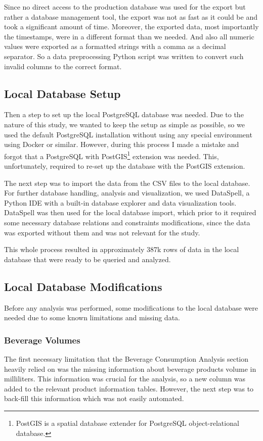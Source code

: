 Since no direct access to the production database was used for the export but rather a database management tool, the export was not as fast as it could be and took a significant amount of time.
Moreover, the exported data, most importantly the timestamps, were in a different format than we needed.
And also all numeric values were exported as a formatted strings with a comma as a decimal separator.
So a data preprocessing Python script was written to convert such invalid columns to the correct format.

\subsection{Local Database Setup}
\label{subsec:data-methodology-local-database-setup}
Then a step to set up the local PostgreSQL database was needed.
Due to the nature of this study, we wanted to keep the setup as simple as possible, so we used the default PostgreSQL installation without using any special environment using Docker or similar.
However, during this process I made a mistake and forgot that a PostgreSQL with PostGIS\footnote{
	PostGIS is a spatial database extender for PostgreSQL object-relational database\cite{postgis_postgis_net}.
} extension was needed.
This, unfortunately, required to re-set up the database with the PostGIS extension.

The next step was to import the data from the CSV files to the local database.
For further database handling, analysis and visualization, we used DataSpell, a Python IDE with a built-in database explorer and data visualization tools.
DataSpell was then used for the local database import, which prior to it required some necessary database relations and constraints modifications, since the data was exported without them and was not relevant for the study.

This whole process resulted in approximately 387k rows of data in the local database that were ready to be queried and analyzed.

\subsection{Local Database Modifications}
\label{subsec:data-methodology-local-database-modifications}
Before any analysis was performed, some modifications to the local database were needed due to some known limitations and missing data.

\subsubsection{Beverage Volumes}
\label{subsubsec:data-methodology-local-database-modifications-volume}
The first necessary limitation that the Beverage Consumption Analysis section heavily relied on was the missing information about beverage products volume in milliliters.
This information was crucial for the analysis, so a new column was added to the relevant product information tables.
However, the next step was to back-fill this information which was not easily automated.

